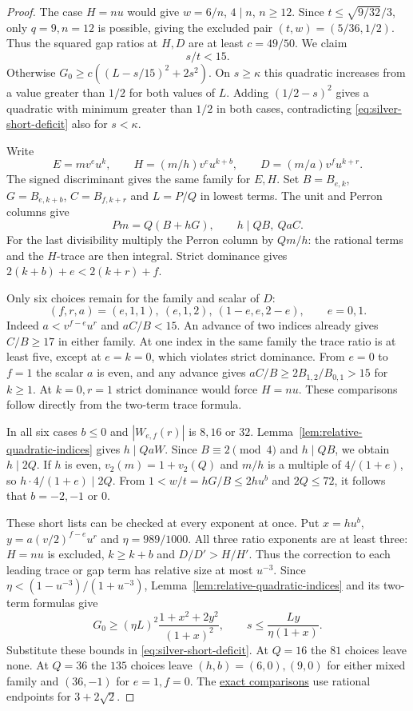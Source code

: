 \documentclass[11pt,reqno]{amsart}
\newcommand{\codecheck}[2]{\href{https://github.com/sebastienpalcoux/grothendieck-ring-classification/blob/d5750105bb5758f3ad38d2e5464dfcc12c019816/supplements/rank6/sphericality/#1}{#2}}
\theoremstyle{remark}\newtheorem{remark}[theorem]{Remark}
\numberwithin{equation}{section}
\begin{document}
\begin{proof}
The case $H=nu$ would give $w=6/n$, $4\mid n$, $n\ge12$.
Since $t\le\sqrt{9/32}/3$, only $q=9,n=12$ is possible, giving
the excluded pair $(t,w)=(5/36,1/2)$. Thus the squared gap
ratios at $H,D$ are at least $c=49/50$. We claim
\[
                            s/t<15 .
\]
Otherwise $G_0\ge c((L-s/15)^2+2s^2)$. On $s\ge\kappa$ this
quadratic increases from a value greater than $1/2$ for both values of $L$. Adding $(1/2-s)^2$ gives a quadratic with minimum
greater than $1/2$ in both cases, contradicting
\eqref{eq:silver-short-deficit} also for $s<\kappa$.

Write
\[
 E=mv^eu^k,\qquad H=(m/h)v^eu^{k+b},\qquad
 D=(m/a)v^fu^{k+r}.
\]
The signed discriminant gives the same family for $E,H$. Set
$B=B_{e,k}$, $G=B_{e,k+b}$, $C=B_{f,k+r}$ and $L=P/Q$ in lowest
terms. The unit and Perron columns give
\[
 Pm=Q(B+hG),\qquad h\mid QB,\ QaC.
\]
For the last divisibility multiply the Perron column by $Qm/h$:
the rational terms and the $H$-trace are then integral.
Strict dominance gives $2(k+b)+e<2(k+r)+f$.

Only six choices remain for the family and scalar of $D$:
\[
 (f,r,a)=(e,1,1),\ (e,1,2),\ (1-e,e,2-e),\qquad e=0,1 .
\]
Indeed $a<v^{f-e}u^r$ and $aC/B<15$. An advance of two indices
already gives $C/B\ge17$ in either family. At one index in the
same family the trace ratio is at least five, except at $e=k=0$,
which violates strict dominance. From $e=0$ to $f=1$ the scalar
$a$ is even, and any advance gives $aC/B\ge2B_{1,2}/B_{0,1}>15$
for $k\ge1$. At $k=0,r=1$ strict dominance would force $H=nu$.
These comparisons follow directly from the two-term trace formula.

In all six cases $b\le0$ and $|W_{e,f}(r)|$ is $8,16$ or $32$.
Lemma~\ref{lem:relative-quadratic-indices} gives $h\mid QaW$.
Since $B\equiv2\pmod4$ and $h\mid QB$, we obtain $h\mid2Q$.
If $h$ is even, $v_2(m)=1+v_2(Q)$ and $m/h$ is a multiple of
$4/(1+e)$, so $h\cdot4/(1+e)\mid2Q$. From $1<w/t=hG/B\le2hu^b$
and $2Q\le72$, it follows that $b=-2,-1$ or $0$.

These short lists can be checked at every exponent at once.
Put $x=hu^b$, $y=a(v/2)^{f-e}u^r$ and $\eta=989/1000$.
All three ratio exponents are at least three: $H=nu$ is excluded,
$k\ge k+b$ and $D/D'>H/H'$. Thus the correction to each leading
trace or gap term has relative size at most $u^{-3}$.
Since $\eta<(1-u^{-3})/(1+u^{-3})$,
Lemma~\ref{lem:relative-quadratic-indices} and its two-term formulas
give
\[
 G_0\ge (\eta L)^2\frac{1+x^2+2y^2}{(1+x)^2},\qquad
 s\le \frac{Ly}{\eta(1+x)} .
\]
Substitute these bounds in \eqref{eq:silver-short-deficit}. At
$Q=16$ the $81$ choices leave none. At $Q=36$ the $135$ choices
leave $(h,b)=(6,0),(9,0)$ for either mixed family and $(36,-1)$
for $e=1,f=0$. The \codecheck{silver_short_profiles.py}{exact comparisons}
use rational endpoints for $3+2\sqrt2$.
\end{proof}
\end{document}
